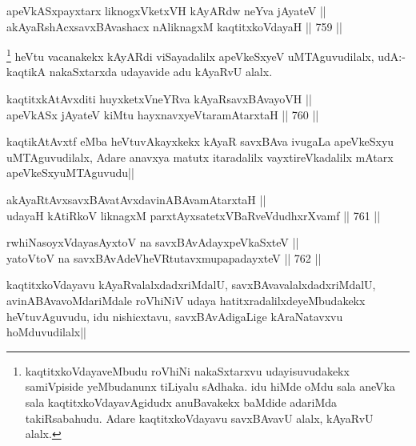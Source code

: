 
\begin{shl}
apeVkASx\s payxtarx liknogxVketxVH kAyARdw neYva jAyateV || \\
akAyaRshAcxsavxBAvashacx nAliknagxM kaqtitxkoVdayaH ||  759 ||  
\end{shl}

\begin{artha}
\footnote{kaqtitxkoVdayaveMbudu roVhiNi nakaSxtarxvu udayisuvudakekx samiVpiside yeMbudanunx tiLiyalu sAdhaka. idu hiMde oMdu sala aneVka sala kaqtitxkoVdayavAgidudx anuBavakekx baMdide adariMda takiRsabahudu. Adare kaqtitxkoVdayavu savxBAvavU alalx, kAyaRvU alalx.}
heVtu vacanakekx kAyARdi viSayadalilx apeVkeSxyeV uMTAguvudilalx, udA:-kaqtikA nakaSxtarxda udayavide adu kAyaRvU alalx.
\end{artha}


\begin{shl}
kaqtitxkAtAvxditi huyxketxVneYRva kAyaRsavxBAvayoVH || \\
apeVkASx jAyateV kiMtu hayxnavxyeVtaramAtarxtaH ||  760 ||  
\end{shl}

\begin{artha}
kaqtikAtAvxtf eMba heVtuvAkayxkekx kAyaR savxBAva ivugaLa apeVkeSxyu uMTAguvudilalx, Adare anavxya matutx itaradalilx vayxtireVkadalilx mAtarx apeVkeSxyuMTAguvudu||
\end{artha}


\begin{shl}
akAyaRtAvxsavxBAvatAvxdavinABAvamAtarxtaH || \\
udayaH kAtiRkoV liknagxM parxtAyxsatetxVBaRveVdudhxrXvamf ||  761 ||  
\end{shl}
				
\begin{shl}
rwhiNasoyxVdayasAyxtoV na savxBAvAdayxpeVkaSxteV || \\
yatoV\s toV na savxBAvAdeVheVRtutavxmupapadayxteV ||  762 ||  
\end{shl}

\begin{artha}
kaqtitxkoVdayavu kAyaRvalalxdadxriMdalU, savxBAvavalalxdadxriMdalU, avinABAvavoMdariMdale roVhiNiV udaya hatitxradalilxdeyeMbudakekx heVtuvAguvudu, idu nishicxtavu, savxBAvAdigaLige kAraNatavxvu hoMduvudilalx||
\end{artha}

